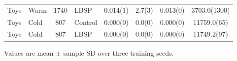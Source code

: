 \begin{table}[!htbp]
\begin{tabular*}{\textwidth}{@{\extracolsep{\fill}}llS[table-format=4.0]lS[table-format=1.3(3)]S[table-format=2.1(3)]S[table-format=1.3(3)]S[table-format=5.1(5)]@{}}
Toys & Warm & 1740 & LBSP & 0.014(1) & 2.7(3) & 0.013(0) & 3703.0(1300)\\ %
Toys & Cold & 807 & Control & 0.000(0) & 0.0(0) & 0.000(0) & 11759.0(65)\\ %
Toys & Cold & 807 & LBSP & 0.000(0) & 0.0(0) & 0.000(0) & 11749.2(97)\\ %
\bottomrule
\end{tabular*}
\par\smallskip\noindent\begin{minipage}{\textwidth}\fontsize{8.5}{11}\selectfont Values are mean $\pm$ sample SD over three training seeds.
\end{minipage}
\end{table}
